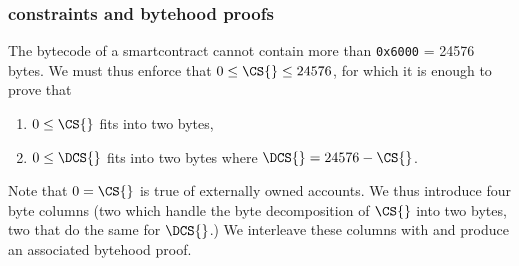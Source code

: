 \subsubsection{\cs{} constraints and bytehood proofs}


The bytecode of a smartcontract cannot contain more than \texttt{0x6000} = 24576 bytes. We must thus enforce that $0\leq \CS{}\leq 24576$, for which it is enough to prove that
\begin{enumerate}
    \item $0\leq \CS{} $ fits into two bytes,
    \item $0\leq \DCS{}$ fits into two bytes where $\DCS{} = 24576 - \CS{}$.
\end{enumerate}
Note that $0=\CS{}$ is true of externally owned accounts. We thus introduce four byte columns (two which handle the byte decomposition of $\CS{}$ into two bytes, two that do the same for $\DCS{}$.) We interleave these columns with \opc{} and produce an associated bytehood proof.